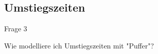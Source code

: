 

\begin{image-frame}
\begin{frame}{}
	\vspace{-1em}
	\begin{center}
	\end{center}
\end{frame}
\end{image-frame}


\subsection{Umstiegszeiten}
\begin{frame}{Frage 3}
\begin{center}
	\vspace{6em}
	\begin{Large}
		Wie modelliere ich Umstiegszeiten mit "{}Puffer"{}?
	\end{Large}
\end{center}
\end{frame}


